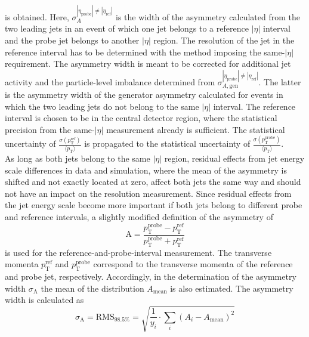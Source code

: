 is obtained. Here, $\sigma^{ |\eta_{\mathrm{probe}}| \neq |\eta_{\mathrm{ref}}|}_{A}$ is the width of the asymmetry calculated from the two leading jets in an event of which one jet belongs to a reference $|\eta|$ interval and the probe jet belongs to another $|\eta|$ region. The resolution of the jet in the reference interval has to be determined with the method imposing the same-$|\eta|$ requirement. The asymmetry width is meant to be corrected for additional jet activity and the particle-level imbalance determined from $\sigma^{|\eta_{\mathrm{probe}}| \neq |\eta_{\mathrm{ref}}|}_{A, \mathrm{gen}}$. The latter is the asymmetry width of the generator asymmetry calculated for events in which the two leading jets do not belong to the same $|\eta|$ interval. The reference interval is chosen to be in the central detector region, where the statistical precision from the same-$|\eta|$ measurement already is sufficient. The statistical uncertainty of $\frac{\sigma (p^\mathrm{ref}_\mathrm{T})}{{\langle p_\mathrm{T} \rangle}}$ is propagated to the statistical uncertainty of $\frac{\sigma (p^\mathrm{probe}_\mathrm{T})}{\langle p_\mathrm{T} \rangle}$. \\
As long as both jets belong to the same $|\eta|$ region, residual effects from jet energy scale differences in data and simulation, where the mean of the asymmetry is shifted and not exactly located at zero, affect both jets the same way and should not have an impact on the resolution measurement. Since residual effects from the jet energy scale become more important if both jets belong to different probe and reference intervals, a slightly modified definition of the asymmetry of
\begin{equation}
\label{eq:forwardasymmdef}
  \mathrm{A} = \frac{p^\mathrm{probe}_{\mathrm{T}} - p^\mathrm{ref}_{\mathrm{T}}}{p^\mathrm{probe}_{\mathrm{T}} + p^\mathrm{ref}_{\mathrm{T}}} 
 \end{equation}
is used for the reference-and-probe-interval measurement. The transverse momenta $p^\mathrm{ref}_{\mathrm{T}}$ and $p^\mathrm{probe}_{\mathrm{T}}$ correspond to the transverse momenta of the reference and probe jet, respectively. Accordingly, in the determination of the asymmetry width $\sigma_\mathrm{A}$ the mean of the distribution $A_\mathrm{mean}$ is also estimated. The asymmetry width is calculated as
\begin{equation}
\label{eq:forwardasymmwidthdef}
  \sigma_\mathrm{A} = \mathrm{RMS}_{98.5\%} = \sqrt{\frac{1}{y_i} \cdot \sum_{i}(A_i-A_\mathrm{mean})^2} 
 \end{equation}
